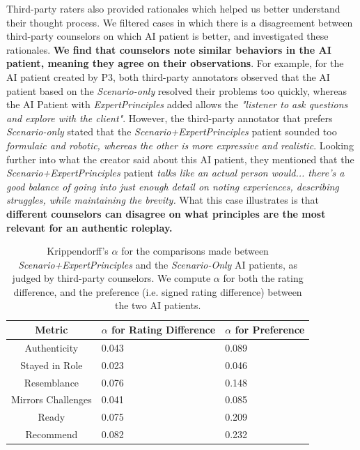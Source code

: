 \documentclass[11pt]{article}
\begin{document}
Third-party raters also provided rationales which helped us better understand their thought process. We filtered cases in which there is a disagreement between third-party counselors on which AI patient is better, and investigated these rationales. \textbf{We find that counselors note similar behaviors in the AI patient, meaning they agree on their observations}. For example, for the AI patient created by P3, both third-party annotators observed that the AI patient based on the \textit{Scenario-only} resolved their problems too quickly, whereas the AI Patient with \textit{ExpertPrinciples} added allows the \textit{"listener to ask questions and explore with the client"}. However, the third-party annotator that prefers \textit{Scenario-only} stated that the \textit{Scenario+ExpertPrinciples} patient sounded too \textit{formulaic and robotic, whereas the other is more expressive and realistic}. Looking further into what the creator said about this AI patient, they mentioned that the \textit{Scenario+ExpertPrinciples} patient \textit{talks like an actual person would... there's a good balance of going into just enough detail on noting experiences, describing struggles, while maintaining the brevity.} What this case illustrates is that \textbf{different counselors can disagree on what principles are the most relevant for an authentic roleplay.}   


\begin{table}[t]
    \small
    \centering
    \begin{tabular}{|c|l|l|} \hline  
         \textbf{Metric}&  \textbf{$\alpha$ for Rating Difference}&\textbf{$\alpha$ for Preference}\\ \hline  
         Authenticity&  0.043 &0.089\\ \hline  
 Stayed in Role&0.023 &0.046\\ \hline 
         Resemblance&   0.076 &0.148\\ \hline  
         Mirrors Challenges&   0.041 &0.085\\ \hline  
         Ready&   0.075 &0.209\\ \hline  
         Recommend&   0.082 &0.232\\ \hline 
    \end{tabular}
    \caption{Krippendorff's $\alpha$ for the comparisons made between \textit{Scenario+ExpertPrinciples} and the \textit{Scenario-Only} AI patients, as judged by third-party counselors. We compute $\alpha$ for both the rating difference, and the preference (i.e. signed rating difference) between the two AI patients.}
    \label{tab:thirdparty_ratingdifference_alpha}
\end{table}
\end{document}
